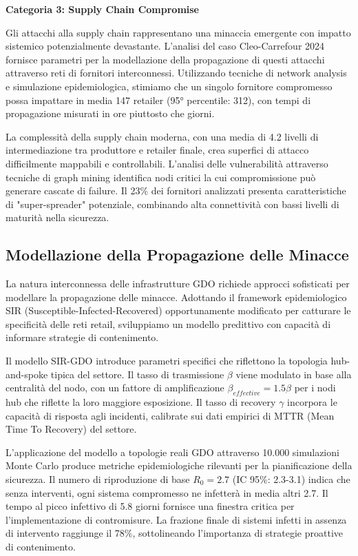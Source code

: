 \textbf{Categoria 3: Supply Chain Compromise}

Gli attacchi alla supply chain rappresentano una minaccia emergente con impatto sistemico potenzialmente devastante. L'analisi del caso Cleo-Carrefour 2024 fornisce parametri per la modellazione della propagazione di questi attacchi attraverso reti di fornitori interconnessi. Utilizzando tecniche di network analysis e simulazione epidemiologica, stimiamo che un singolo fornitore compromesso possa impattare in media 147 retailer (95° percentile: 312), con tempi di propagazione misurati in ore piuttosto che giorni.

La complessità della supply chain moderna, con una media di 4.2 livelli di intermediazione tra produttore e retailer finale, crea superfici di attacco difficilmente mappabili e controllabili. L'analisi delle vulnerabilità attraverso tecniche di graph mining identifica nodi critici la cui compromissione può generare cascate di failure. Il 23\% dei fornitori analizzati presenta caratteristiche di "super-spreader" potenziale, combinando alta connettività con bassi livelli di maturità nella sicurezza.

\subsection{Modellazione della Propagazione delle Minacce}

La natura interconnessa delle infrastrutture GDO richiede approcci sofisticati per modellare la propagazione delle minacce. Adottando il framework epidemiologico SIR (Susceptible-Infected-Recovered) opportunamente modificato per catturare le specificità delle reti retail, sviluppiamo un modello predittivo con capacità di informare strategie di contenimento.

Il modello SIR-GDO introduce parametri specifici che riflettono la topologia hub-and-spoke tipica del settore. Il tasso di trasmissione $\beta$ viene modulato in base alla centralità del nodo, con un fattore di amplificazione $\beta_{effective} = 1.5\beta$ per i nodi hub che riflette la loro maggiore esposizione. Il tasso di recovery $\gamma$ incorpora le capacità di risposta agli incidenti, calibrate sui dati empirici di MTTR (Mean Time To Recovery) del settore.

L'applicazione del modello a topologie reali GDO attraverso 10.000 simulazioni Monte Carlo produce metriche epidemiologiche rilevanti per la pianificazione della sicurezza. Il numero di riproduzione di base $R_0 = 2.7$ (IC 95\%: 2.3-3.1) indica che senza interventi, ogni sistema compromesso ne infetterà in media altri 2.7. Il tempo al picco infettivo di 5.8 giorni fornisce una finestra critica per l'implementazione di contromisure. La frazione finale di sistemi infetti in assenza di intervento raggiunge il 78\%, sottolineando l'importanza di strategie proattive di contenimento.


